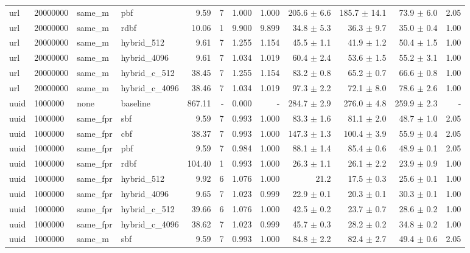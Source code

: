 \begin{tabular}{llllrrrrrrrr}
url & 20000000 & same\_m & pbf & 9.59 & 7 & 1.000 & 1.000 & 205.6 $\pm$ 6.6 & 185.7 $\pm$ 14.1 & 73.9 $\pm$ 6.0 & 2.05 \\
url & 20000000 & same\_m & rdbf & 10.06 & 1 & 9.900 & 9.899 & 34.8 $\pm$ 5.3 & 36.3 $\pm$ 9.7 & 35.0 $\pm$ 0.4 & 1.00 \\
url & 20000000 & same\_m & hybrid\_512 & 9.61 & 7 & 1.255 & 1.154 & 45.5 $\pm$ 1.1 & 41.9 $\pm$ 1.2 & 50.4 $\pm$ 1.5 & 1.00 \\
url & 20000000 & same\_m & hybrid\_4096 & 9.61 & 7 & 1.034 & 1.019 & 60.4 $\pm$ 2.4 & 53.6 $\pm$ 1.5 & 55.2 $\pm$ 3.1 & 1.00 \\
url & 20000000 & same\_m & hybrid\_c\_512 & 38.45 & 7 & 1.255 & 1.154 & 83.2 $\pm$ 0.8 & 65.2 $\pm$ 0.7 & 66.6 $\pm$ 0.8 & 1.00 \\
url & 20000000 & same\_m & hybrid\_c\_4096 & 38.46 & 7 & 1.034 & 1.019 & 97.3 $\pm$ 2.2 & 72.1 $\pm$ 8.0 & 78.6 $\pm$ 2.6 & 1.00 \\
uuid & 1000000 & none & baseline & 867.11 & - & 0.000 & - & 284.7 $\pm$ 2.9 & 276.0 $\pm$ 4.8 & 259.9 $\pm$ 2.3 & - \\
uuid & 1000000 & same\_fpr & sbf & 9.59 & 7 & 0.993 & 1.000 & 83.3 $\pm$ 1.6 & 81.1 $\pm$ 2.0 & 48.7 $\pm$ 1.0 & 2.05 \\
uuid & 1000000 & same\_fpr & cbf & 38.37 & 7 & 0.993 & 1.000 & 147.3 $\pm$ 1.3 & 100.4 $\pm$ 3.9 & 55.9 $\pm$ 0.4 & 2.05 \\
uuid & 1000000 & same\_fpr & pbf & 9.59 & 7 & 0.984 & 1.000 & 88.1 $\pm$ 1.4 & 85.4 $\pm$ 0.6 & 48.9 $\pm$ 0.1 & 2.05 \\
uuid & 1000000 & same\_fpr & rdbf & 104.40 & 1 & 0.993 & 1.000 & 26.3 $\pm$ 1.1 & 26.1 $\pm$ 2.2 & 23.9 $\pm$ 0.9 & 1.00 \\
uuid & 1000000 & same\_fpr & hybrid\_512 & 9.92 & 6 & 1.076 & 1.000 & 21.2 & 17.5 $\pm$ 0.3 & 25.6 $\pm$ 0.1 & 1.00 \\
uuid & 1000000 & same\_fpr & hybrid\_4096 & 9.65 & 7 & 1.023 & 0.999 & 22.9 $\pm$ 0.1 & 20.3 $\pm$ 0.1 & 30.3 $\pm$ 0.1 & 1.00 \\
uuid & 1000000 & same\_fpr & hybrid\_c\_512 & 39.66 & 6 & 1.076 & 1.000 & 42.5 $\pm$ 0.2 & 23.7 $\pm$ 0.7 & 28.6 $\pm$ 0.2 & 1.00 \\
uuid & 1000000 & same\_fpr & hybrid\_c\_4096 & 38.62 & 7 & 1.023 & 0.999 & 45.7 $\pm$ 0.3 & 28.2 $\pm$ 0.2 & 34.8 $\pm$ 0.2 & 1.00 \\
uuid & 1000000 & same\_m & sbf & 9.59 & 7 & 0.993 & 1.000 & 84.8 $\pm$ 2.2 & 82.4 $\pm$ 2.7 & 49.4 $\pm$ 0.6 & 2.05 \\

\end{tabular}
